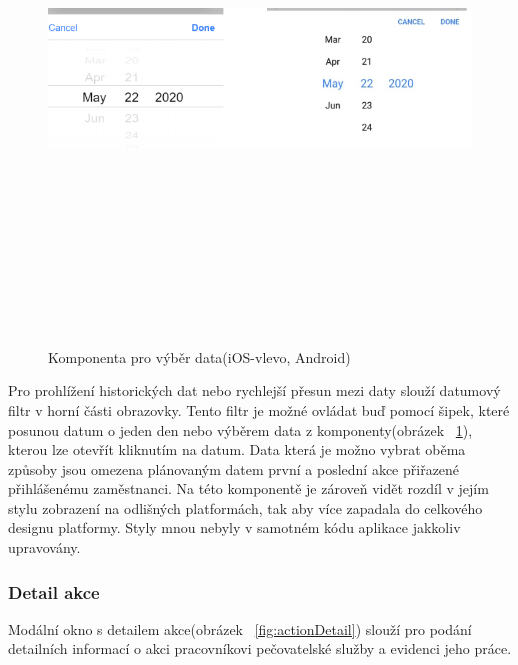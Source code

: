 \documentclass[
  biblatex,
  glossaries,
  index
]{kidiplom}
\begin{document}
\begin{figure}[H]
  	\centering
 	 \includegraphics[width=14cm,height=14cm,keepaspectratio]{datepicker}
 	 \caption{Komponenta pro výběr data(iOS-vlevo, Android)}
 	 \label{fig:datepicker}
\end{figure}

Pro prohlížení historických dat nebo rychlejší přesun mezi daty slouží datumový filtr v horní části obrazovky. Tento filtr je možné ovládat buď pomocí šipek, které posunou datum o jeden den nebo výběrem data z komponenty(obrázek ~\ref{fig:datepicker}), kterou lze otevřít kliknutím na datum. Data která je možno vybrat oběma způsoby jsou omezena plánovaným datem první a poslední akce přiřazené přihlášenému zaměstnanci. Na této komponentě je zároveň vidět rozdíl v jejím stylu zobrazení na odlišných platformách, tak aby více zapadala do celkového designu platformy. Styly mnou nebyly v samotném kódu aplikace jakkoliv upravovány. 

\subsubsection{Detail akce}
\label{sec:actionDetail}
Modální okno s detailem akce(obrázek ~\ref{fig:actionDetail}) slouží pro podání detailních informací o akci pracovníkovi pečovatelské služby a evidenci jeho práce.
\end{document}
